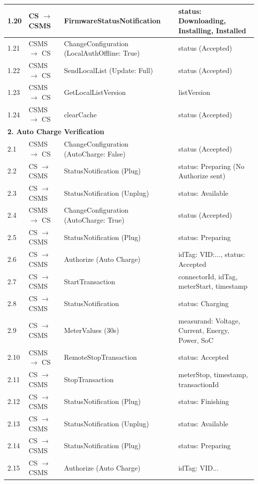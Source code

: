 \documentclass[a4paper,11pt]{report}
\begin{document}
\begin{footnotesize}
\begin{longtable}{|p{1.2cm}|p{2.5cm}|p{5.5cm}|p{6cm}|}
\hline
1.20 & CS $\to$ CSMS & FirmwareStatusNotification & status: Downloading, Installing, Installed \\
\hline
1.21 & CSMS $\to$ CS & ChangeConfiguration (LocalAuthOffline: True) & status (Accepted) \\
\hline
1.22 & CSMS $\to$ CS & SendLocalList (Update: Full) & status (Accepted) \\
\hline
1.23 & CSMS $\to$ CS & GetLocalListVersion & listVersion \\
\hline
1.24 & CSMS $\to$ CS & clearCache & status (Accepted) \\
\hline

\multicolumn{4}{|l|}{\textbf{2. Auto Charge Verification}} \\
\hline
2.1 & CSMS $\to$ CS & ChangeConfiguration (AutoCharge: False) & status (Accepted) \\
\hline
2.2 & CS $\to$ CSMS & StatusNotification (Plug) & status: Preparing (No Authorize sent) \\
\hline
2.3 & CS $\to$ CSMS & StatusNotification (Unplug) & status: Available \\
\hline
2.4 & CSMS $\to$ CS & ChangeConfiguration (AutoCharge: True) & status (Accepted) \\
\hline
2.5 & CS $\to$ CSMS & StatusNotification (Plug) & status: Preparing \\
\hline
2.6 & CS $\to$ CSMS & Authorize (Auto Charge) & idTag: VID:..., status: Accepted \\
\hline
2.7 & CS $\to$ CSMS & StartTransaction & connectorId, idTag, meterStart, timestamp \\
\hline
2.8 & CS $\to$ CSMS & StatusNotification & status: Charging \\
\hline
2.9 & CS $\to$ CSMS & MeterValues (30s) & measurand: Voltage, Current, Energy, Power, SoC \\
\hline
2.10 & CSMS $\to$ CS & RemoteStopTransaction & status: Accepted \\
\hline
2.11 & CS $\to$ CSMS & StopTransaction & meterStop, timestamp, transactionId \\
\hline
2.12 & CS $\to$ CSMS & StatusNotification (Plug) & status: Finishing \\
\hline
2.13 & CS $\to$ CSMS & StatusNotification (Unplug) & status: Available \\
\hline
2.14 & CS $\to$ CSMS & StatusNotification (Plug) & status: Preparing \\
\hline
2.15 & CS $\to$ CSMS & Authorize (Auto Charge) & idTag: VID... \\

\end{longtable}
\end{footnotesize}
\end{document}
